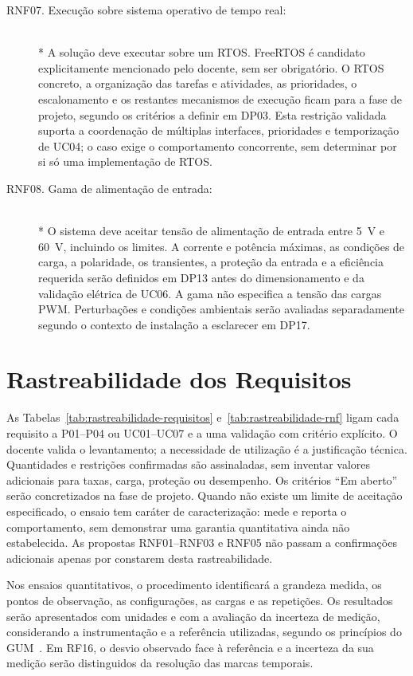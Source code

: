 \begin{description}
    \item[RNF07. Execução sobre sistema operativo de tempo real:] \hfill\\*
    A solução deve executar sobre um RTOS. FreeRTOS é candidato
    explicitamente mencionado pelo docente, sem ser obrigatório.
    O RTOS concreto, a organização das tarefas e atividades, as
    prioridades, o escalonamento e os restantes mecanismos de execução
    ficam para a fase de projeto, segundo os critérios a definir em DP03.
    Esta restrição validada suporta a coordenação de múltiplas interfaces,
    prioridades e temporização de UC04; o caso exige o comportamento
    concorrente, sem determinar por si só uma implementação de RTOS.

    \item[RNF08. Gama de alimentação de entrada:] \hfill\\*
    O sistema deve aceitar tensão de alimentação de entrada entre
    5~V e 60~V, incluindo os limites. A corrente e potência máximas,
    as condições de carga, a polaridade, os transientes, a proteção da
    entrada e a eficiência requerida serão definidos em DP13 antes
    do dimensionamento e da validação elétrica de UC06. A gama não
    especifica a tensão das cargas PWM. Perturbações e condições ambientais
    serão avaliadas separadamente segundo o contexto de instalação a
    esclarecer em DP17.
\end{description}

\section{Rastreabilidade dos Requisitos}

As Tabelas~\ref{tab:rastreabilidade-requisitos}
e~\ref{tab:rastreabilidade-rnf} ligam cada requisito a P01--P04 ou
UC01--UC07 e a uma validação com critério explícito. O docente valida
o levantamento; a necessidade de utilização é a justificação técnica.
Quantidades e restrições confirmadas são assinaladas, sem inventar
valores adicionais para taxas, carga, proteção ou desempenho. Os critérios
\enquote{Em aberto} serão concretizados na fase de projeto. Quando não
existe um limite de aceitação especificado, o ensaio tem caráter de
caracterização: mede e reporta o comportamento, sem demonstrar uma
garantia quantitativa ainda não estabelecida.
As propostas RNF01--RNF03 e RNF05 não passam a confirmações adicionais
apenas por constarem desta rastreabilidade.

Nos ensaios quantitativos, o procedimento identificará a grandeza medida,
os pontos de observação, as configurações, as cargas e as repetições.
Os resultados serão apresentados com unidades e com a avaliação da
incerteza de medição, considerando a instrumentação e a referência
utilizadas, segundo os princípios do GUM~\cite[sec.~7]{jcgm_gum_2008}.
Em RF16, o desvio observado face à referência e a incerteza da sua
medição serão distinguidos da resolução das marcas temporais.

